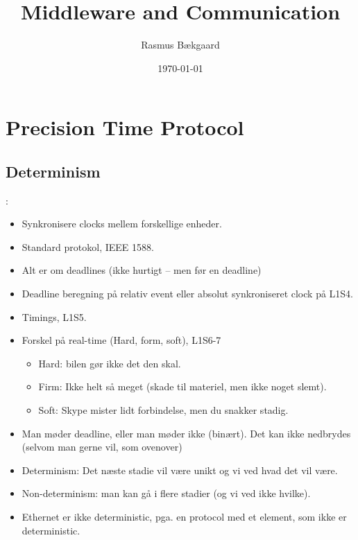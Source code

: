 \documentclass[oneside, 10pt]{article}
\title{Middleware and Communication}
\author{Rasmus Bækgaard}
\date{\today}
\begin{document}
\maketitle

\section{Precision Time Protocol}

\subsection{Determinism}:
\begin{itemize}
	\item Synkronisere clocks mellem forskellige enheder.
	\item Standard protokol, IEEE 1588.
	\item Alt er om deadlines (ikke hurtigt -- men før en deadline)
	\item Deadline beregning på relativ event eller absolut synkroniseret clock på L1S4.
	\item Timings, L1S5.
	\item Forskel på real-time (Hard, form, soft), L1S6-7
	\begin{itemize}
		\item Hard: bilen gør ikke det den skal.
		\item Firm: Ikke helt så meget (skade til materiel, men ikke noget slemt).
		\item Soft: Skype mister lidt forbindelse, men du snakker stadig.
	\end{itemize}

	\item Man møder deadline, eller man møder ikke (binært). Det kan ikke nedbrydes (selvom man gerne vil, som ovenover)
	\item Determinism: Det næste stadie vil være unikt og vi ved hvad det vil være.
	\item Non-determinism: man kan gå i flere stadier (og vi ved ikke hvilke).

	\item Ethernet er ikke deterministic, pga. en protocol med et element, som ikke er deterministic.
\end{itemize}
\end{document}

